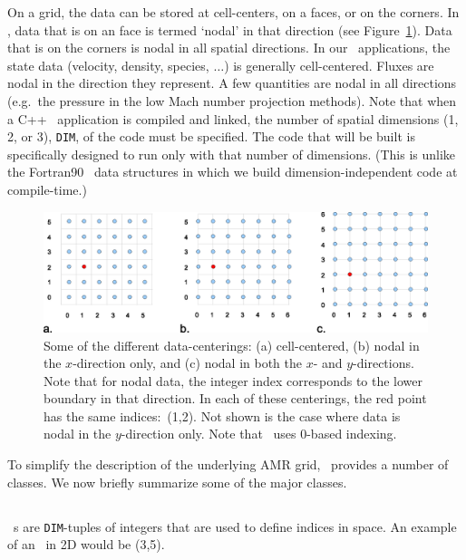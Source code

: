 On a grid, the data can be stored at cell-centers, on a faces, or
on the corners.  In \BoxLib, data that is on an face is termed `nodal'
in that direction (see Figure~\ref{fig:dataloc}).  Data that is on the
corners is nodal in all spatial directions.  In our \BoxLib\ applications, 
the state data (velocity, density, species, $\ldots$) is generally
cell-centered.  Fluxes are nodal in the direction they represent.
A few quantities are nodal in all directions (e.g.\ the pressure in
the low Mach number projection methods).  
Note that when a C++ \BoxLib\ application is compiled and linked,
the number of spatial dimensions (1, 2, or 3), {\tt DIM},
of the code must be specified.  The code that will be
built is specifically designed to run only with that number of dimensions.
(This is unlike the Fortran90 \BoxLib\ data structures in which we build
dimension-independent code at compile-time.)
\begin{figure}[h]
\centering
\includegraphics[width=6.5in]{./Overview/data_loc2}
\caption{\label{fig:dataloc} Some of the different data-centerings:
(a) cell-centered, (b) nodal in the $x$-direction only, and (c) nodal in
both the $x$- and $y$-directions.  Note that for nodal data, the
integer index corresponds to the lower boundary in that direction.
In each of these centerings, the red point has the same indices:\ (1,2).
Not shown is the case where data is nodal in the $y$-direction only.  
Note that \BoxLib\ uses $0$-based indexing.}
\end{figure}

To simplify the description of the underlying AMR grid, \BoxLib\
provides a number of classes.  We now briefly summarize some of the major
classes.

\subsection{\IntVect}

\IntVect~s are {\tt DIM}-tuples of integers that are used to define
indices in space.  An example of an \IntVect\ in 2D would
be (3,5).

